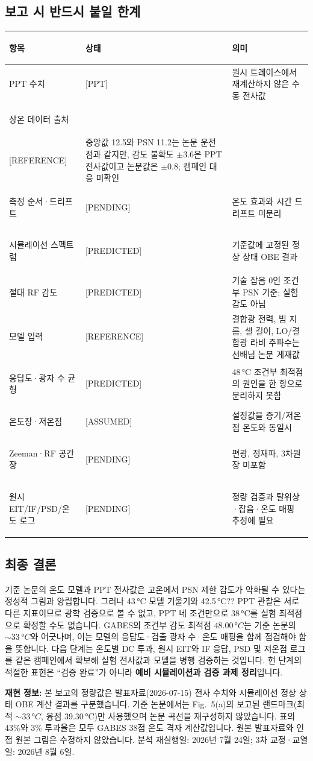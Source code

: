 \documentclass[10pt,a4paper]{article}
\newcommand{\Status}[1]{\textsf{\footnotesize[#1]}}
\providecommand{\SensitivityOptimumTemperatureC}{48.00}
\providecommand{\PaperPSNOptimumC}{33}
\providecommand{\RbMeltingC}{39.30}
\begin{document}
\subsection*{보고 시 반드시 붙일 한계}

\begin{tabularx}{\textwidth}{>{\bfseries\raggedright\arraybackslash}p{3.35cm}p{2.05cm}X}
\toprule
항목 & 상태 & 의미\\
\midrule
PPT 수치 & \Status{PPT} & 원시 트레이스에서 재계산하지 않은 수동 전사값\\
상온 데이터 출처 & \shortstack{\Status{PPT}\\[-0.15em]\Status{REFERENCE}} & 중앙값 12.5와 PSN 11.2는 논문 운전점과 같지만,
  감도 불확도 \(\pm3.6\)은 PPT 전사값이고 논문값은 \(\pm0.8\); 캠페인 대응 미확인\\
측정 순서·드리프트 & \Status{PENDING} & 온도 효과와 시간 드리프트 미분리\\
시뮬레이션 스펙트럼 & \Status{PREDICTED} & 기준값에 고정된 정상 상태 OBE 결과\\
절대 RF 감도 & \Status{PREDICTED} & 기술 잡음 0인 조건부 PSN 기준; 실험 감도 아님\\
모델 입력 & \Status{REFERENCE} & 결합광 전력, 빔 지름, 셀 길이, LO/결합광 라비 주파수는
  선배님 논문 게재값\\
응답도·광자 수 균형 & \Status{PREDICTED} & 48\,°C 조건부 최적점의 원인을 한 항으로 분리하지 못함\\
온도장·저온점 & \Status{ASSUMED} & 설정값을 증기/저온점 온도와 동일시\\
Zeeman·RF 공간장 & \Status{PENDING} & 편광, 정재파, 3차원 장 미포함\\
원시 EIT/IF/PSD/온도 로그 & \Status{PENDING} & 정량 검증과 탈위상·잡음·온도 매핑 추정에 필요\\
\bottomrule
\end{tabularx}

\subsection*{최종 결론}

기준 논문의 온도 모델과 PPT 전사값은 고온에서 PSN 제한 감도가 악화될 수 있다는 정성적 그림과
양립합니다. 그러나 43\,°C 모델 기울기와 42.5\,°C?? PPT 관찰은 서로 다른 지표이므로 광학 검증으로
볼 수 없고, PPT 네 조건만으로 38\,°C를 실험 최적점으로 확정할 수도 없습니다. GABES의 조건부 감도
최적점 \(\SensitivityOptimumTemperatureC\,°C\)는 기준 논문의 \(\sim\PaperPSNOptimumC\,°C\)와 어긋나며,
이는 모델의 응답도·검출 광자 수·온도 매핑을 함께 점검해야 함을 뜻합니다. 다음 단계는 온도별 DC 투과,
원시 EIT와 IF 응답, PSD 및 저온점 로그를 같은 캠페인에서 확보해 실험 전사값과 모델을 병행 검증하는
것입니다. 현 단계의 적절한 표현은 ``검증 완료''가 아니라 \textbf{예비 시뮬레이션과 검증 과제 정리}입니다.

{\footnotesize
\textbf{재현 정보:} 본 보고의 정량값은 발표자료(2026-07-15) 전사 수치와 시뮬레이션 정상 상태 OBE 계산
결과를 구분했습니다. 기준 논문에서는 Fig.\ 5(a)의 보고된 랜드마크(최적
\(\sim\PaperPSNOptimumC\,°C\), 융점 \RbMeltingC\,°C)만 사용했으며 논문 곡선을 재구성하지 않았습니다.
표의 43\%와 3\% 투과율은 모두 GABES 38점 온도 격자 계산값입니다. 원본 발표자료와 인접 원본 그림은
수정하지 않았습니다. 분석 재실행일: 2026년 7월 24일; 3차 교정·교열일: 2026년 8월 6일.}
\end{document}
